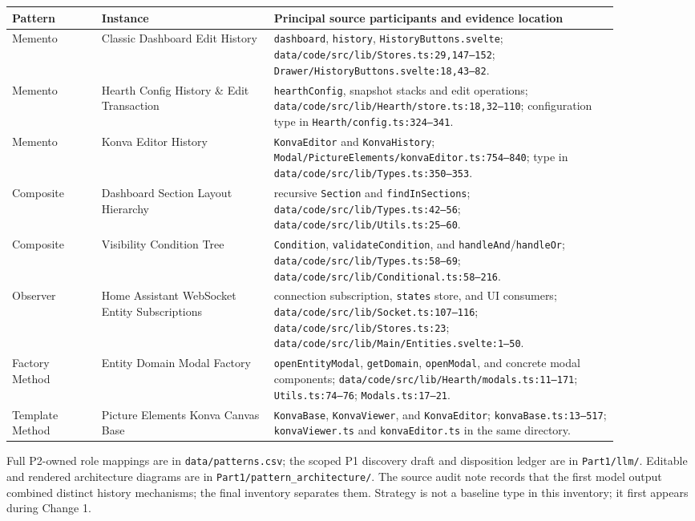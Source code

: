 \documentclass[11pt,a4paper]{article}
\newcommand{\code}[1]{\texttt{\small #1}}
\begin{document}
\begin{longtable}{p{0.13\linewidth}p{0.25\linewidth}p{0.50\linewidth}}
\toprule
Pattern & Instance & Principal source participants and evidence location \\
\midrule
\endhead
Memento & Classic Dashboard Edit History & \code{dashboard}, \code{history}, \code{HistoryButtons.svelte}; \code{data/code/src/lib/Stores.ts:29,147--152}; \code{Drawer/HistoryButtons.svelte:18,43--82}. \\
Memento & Hearth Config History \& Edit Transaction & \code{hearthConfig}, snapshot stacks and edit operations; \code{data/code/src/lib/Hearth/store.ts:18,32--110}; configuration type in \code{Hearth/config.ts:324--341}. \\
Memento & Konva Editor History & \code{KonvaEditor} and \code{KonvaHistory}; \code{Modal/PictureElements/konvaEditor.ts:754--840}; type in \code{data/code/src/lib/Types.ts:350--353}. \\
Composite & Dashboard Section Layout Hierarchy & recursive \code{Section} and \code{findInSections}; \code{data/code/src/lib/Types.ts:42--56}; \code{data/code/src/lib/Utils.ts:25--60}. \\
Composite & Visibility Condition Tree & \code{Condition}, \code{validateCondition}, and \code{handleAnd}/\code{handleOr}; \code{data/code/src/lib/Types.ts:58--69}; \code{data/code/src/lib/Conditional.ts:58--216}. \\
Observer & Home Assistant WebSocket Entity Subscriptions & connection subscription, \code{states} store, and UI consumers; \code{data/code/src/lib/Socket.ts:107--116}; \code{data/code/src/lib/Stores.ts:23}; \code{data/code/src/lib/Main/Entities.svelte:1--50}. \\
Factory Method & Entity Domain Modal Factory & \code{openEntityModal}, \code{getDomain}, \code{openModal}, and concrete modal components; \code{data/code/src/lib/Hearth/modals.ts:11--171}; \code{Utils.ts:74--76}; \code{Modals.ts:17--21}. \\
Template Method & Picture Elements Konva Canvas Base & \code{KonvaBase}, \code{KonvaViewer}, and \code{KonvaEditor}; \code{konvaBase.ts:13--517}; \code{konvaViewer.ts} and \code{konvaEditor.ts} in the same directory. \\
\bottomrule
\end{longtable}

Full P2-owned role mappings are in \code{data/patterns.csv}; the scoped P1
discovery draft and disposition ledger are in \code{Part1/llm/}. Editable and
rendered architecture diagrams are in \code{Part1/pattern\_architecture/}.
The source audit note records that the first model output combined distinct
history mechanisms; the final inventory separates them. Strategy is not a
baseline type in this inventory; it first appears during Change 1.
\end{document}
